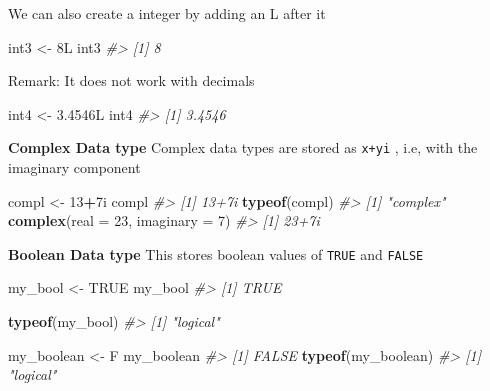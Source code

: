 \documentclass[
]{book}
\newenvironment{Shaded}{\begin{snugshade}}{\end{snugshade}}
\newcommand{\AttributeTok}[1]{\textcolor[rgb]{0.13,0.29,0.53}{#1}}
\newcommand{\CommentTok}[1]{\textcolor[rgb]{0.56,0.35,0.01}{\textit{#1}}}
\newcommand{\ConstantTok}[1]{\textcolor[rgb]{0.56,0.35,0.01}{#1}}
\newcommand{\DataTypeTok}[1]{\textcolor[rgb]{0.13,0.29,0.53}{#1}}
\newcommand{\DecValTok}[1]{\textcolor[rgb]{0.00,0.00,0.81}{#1}}
\newcommand{\FloatTok}[1]{\textcolor[rgb]{0.00,0.00,0.81}{#1}}
\newcommand{\FunctionTok}[1]{\textcolor[rgb]{0.13,0.29,0.53}{\textbf{#1}}}
\newcommand{\NormalTok}[1]{#1}
\newcommand{\OtherTok}[1]{\textcolor[rgb]{0.56,0.35,0.01}{#1}}
\newcommand{\SpecialCharTok}[1]{\textcolor[rgb]{0.81,0.36,0.00}{\textbf{#1}}}
\begin{document}
We can also create a integer by adding an L after it

\begin{Shaded}
\begin{Highlighting}[]
\NormalTok{int3 }\OtherTok{\textless{}{-}} \DecValTok{8}\DataTypeTok{L}
\NormalTok{int3}
\CommentTok{\#\textgreater{} [1] 8}
\end{Highlighting}
\end{Shaded}

Remark: It does not work with decimals

\begin{Shaded}
\begin{Highlighting}[]
\NormalTok{int4 }\OtherTok{\textless{}{-}} \FloatTok{3.4546}\NormalTok{L}
\NormalTok{int4}
\CommentTok{\#\textgreater{} [1] 3.4546}
\end{Highlighting}
\end{Shaded}

\textbf{Complex Data type}
Complex data types are stored as \texttt{x+yi} , i.e, with the imaginary component

\begin{Shaded}
\begin{Highlighting}[]
\NormalTok{compl }\OtherTok{\textless{}{-}} \DecValTok{13}\SpecialCharTok{+}\DecValTok{7}\DataTypeTok{i}
\NormalTok{compl}
\CommentTok{\#\textgreater{} [1] 13+7i}
\FunctionTok{typeof}\NormalTok{(compl)}
\CommentTok{\#\textgreater{} [1] "complex"}
\FunctionTok{complex}\NormalTok{(}\AttributeTok{real =} \DecValTok{23}\NormalTok{, }\AttributeTok{imaginary =} \DecValTok{7}\NormalTok{)}
\CommentTok{\#\textgreater{} [1] 23+7i}
\end{Highlighting}
\end{Shaded}

\textbf{Boolean Data type }
This stores boolean values of \texttt{TRUE} and \texttt{FALSE}

\begin{Shaded}
\begin{Highlighting}[]
\NormalTok{my\_bool }\OtherTok{\textless{}{-}} \ConstantTok{TRUE}
\NormalTok{my\_bool}
\CommentTok{\#\textgreater{} [1] TRUE}

\FunctionTok{typeof}\NormalTok{(my\_bool)}
\CommentTok{\#\textgreater{} [1] "logical"}

\NormalTok{my\_boolean }\OtherTok{\textless{}{-}}\NormalTok{ F}
\NormalTok{my\_boolean}
\CommentTok{\#\textgreater{} [1] FALSE}
\FunctionTok{typeof}\NormalTok{(my\_boolean)}
\CommentTok{\#\textgreater{} [1] "logical"}
\end{Highlighting}
\end{Shaded}
\end{document}
